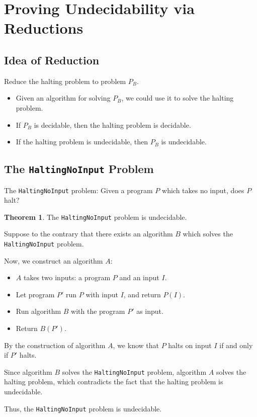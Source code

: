\documentclass[11pt]{article}
\makeatletter
\theoremstyle{definition}
\newtheorem{thm}{Theorem}[section]
\newenvironment{pf}[1][\proofname]{\par
  \pushQED{\qed}%
  \normalfont \topsep0\p@\relax
  \trivlist
  \item[\hskip\labelsep\itshape
  #1\@addpunct{.}]\ignorespaces
}{%
  \popQED\endtrivlist\@endpefalse
}
\makeatother
\begin{document}
\newpage
\section{Proving Undecidability via Reductions}

\subsection{Idea of Reduction}
Reduce the halting problem to problem $P_B$.\vspace{-1.5ex}
\begin{itemize}
    \item Given an algorithm for solving $P_B$, we could use it to solve the halting problem.
    \item If $P_B$ is decidable, then the halting problem is decidable.
    \item If the halting problem is undecidable, then $P_B$ is undecidable.
\end{itemize}\vspace{-1.5ex}

\subsection{The {\tt HaltingNoInput} Problem}
The {\tt HaltingNoInput} problem: Given a program $P$ which takes no input, does $P$ halt?

\begin{thm}
The {\tt HaltingNoInput} problem is undecidable.
\begin{pf}
Suppose to the contrary that there exists an algorithm $B$ which solves the {\tt HaltingNoInput} problem.

Now, we construct an algorithm $A$:\vspace{-1.5ex}
\begin{itemize}
    \item $A$ takes two inputs: a program $P$ and an input $I$.
    \item Let program $P'$ run $P$ with input $I$, and return $P(I)$.
    \item Run algorithm $B$ with the program $P'$ as input.
    \item Return $B(P')$.
\end{itemize}\vspace{-1.5ex}
By the construction of algorithm $A$, we know that $P$ halts on input $I$ if and only if $P'$ halts.

Since algorithm $B$ solves the {\tt HaltingNoInput} problem, algorithm $A$ solves the halting problem, which contradicts the fact that the halting problem is undecidable. 

Thus, the {\tt HaltingNoInput} problem is undecidable. 
\end{pf}
\end{thm}
\end{document}
